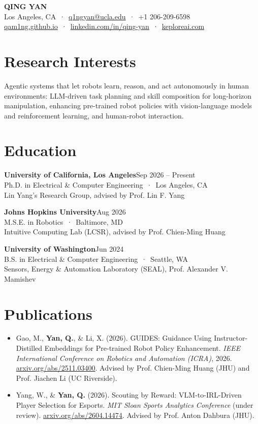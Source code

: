 \documentclass[10pt,letterpaper]{article}
\newcommand{\entry}[4]{\noindent\textbf{#1}\hfill {\color{muted}\small #2}\\ {\color{muted}#3 \,·\, #4}}
\begin{document}
\begin{center}
{\serif\Huge\bfseries QING YAN}\\[3pt]
{\color{muted}Los Angeles, CA \,·\, \href{mailto:q1ngyan@ucla.edu}{q1ngyan@ucla.edu} \,·\, +1 206-209-6598}\\
\href{https://qam1ng.github.io}{qam1ng.github.io} \,·\, \href{https://linkedin.com/in/qing-yan}{linkedin.com/in/qing-yan} \,·\, \href{https://keploreai.com}{keploreai.com}
\end{center}

\section{Research Interests}
Agentic systems that let robots learn, reason, and act autonomously in human environments: LLM-driven task planning and skill composition for long-horizon manipulation, enhancing pre-trained robot policies with vision-language models and reinforcement learning, and human-robot interaction.

\section{Education}
\entry{University of California, Los Angeles}{Sep 2026 -- Present}{Ph.D. in Electrical \& Computer Engineering}{Los Angeles, CA}\\ {\color{muted}Lin Yang's Research Group, advised by Prof. Lin F. Yang}

\entry{Johns Hopkins University}{Aug 2026}{M.S.E. in Robotics}{Baltimore, MD}\\ {\color{muted}Intuitive Computing Lab (LCSR), advised by Prof. Chien-Ming Huang}

\entry{University of Washington}{Jun 2024}{B.S. in Electrical \& Computer Engineering}{Seattle, WA}\\ {\color{muted}Sensors, Energy \& Automation Laboratory (SEAL), Prof. Alexander V. Mamishev}

\section{Publications}
\begin{itemize}
\item Gao, M., \textbf{Yan, Q.}, \& Li, X. (2026). GUIDES: Guidance Using Instructor-Distilled Embeddings for Pre-trained Robot Policy Enhancement. \textit{IEEE International Conference on Robotics and Automation (ICRA)}, 2026. \href{https://arxiv.org/abs/2511.03400}{arxiv.org/abs/2511.03400}. Advised by Prof. Chien-Ming Huang (JHU) and Prof. Jiachen Li (UC Riverside).
\item Yang, W., \& \textbf{Yan, Q.} (2026). Scouting by Reward: VLM-to-IRL-Driven Player Selection for Esports. \textit{MIT Sloan Sports Analytics Conference} (under review). \href{https://arxiv.org/abs/2604.14474}{arxiv.org/abs/2604.14474}. Advised by Prof. Anton Dahbura (JHU).
\end{itemize}
\end{document}
